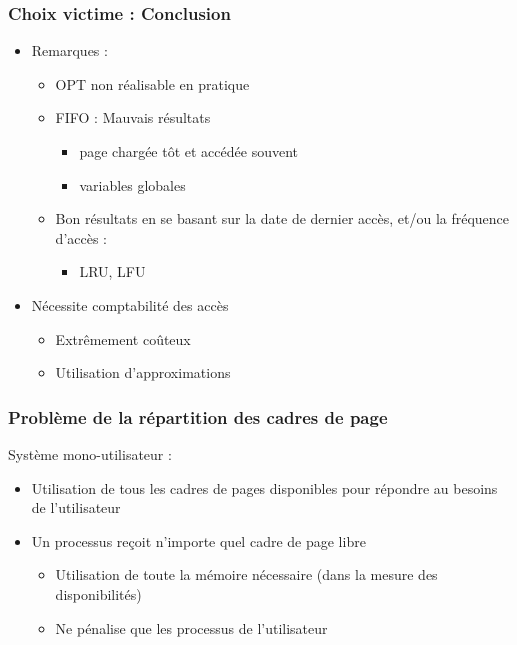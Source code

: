 \begin{frame}
\frametitle{Choix victime : Conclusion}
\begin{itemize}
\item Remarques :
\begin{itemize}
\item OPT non réalisable en pratique
\item FIFO : Mauvais résultats
\begin{itemize}
\item page chargée tôt et accédée souvent
\item variables globales
\end{itemize}

\item Bon résultats en se basant sur la date de dernier accès, et/ou la fréquence d'accès :
\begin{itemize}
\item LRU, LFU
\end{itemize}
\end{itemize}
\item Nécessite comptabilité des accès
\begin{itemize}
\item Extrêmement coûteux
\item Utilisation d'approximations
\end{itemize}
\end{itemize}
\end{frame}


\begin{frame}
\frametitle{Problème de la répartition des cadres de page}
Système mono-utilisateur :
\begin{itemize}
\item Utilisation de tous les cadres de pages disponibles pour répondre au besoins de l'utilisateur
\item Un processus reçoit n'importe quel cadre de page libre
\begin{itemize}
\item Utilisation de toute la mémoire nécessaire (dans la mesure des disponibilités)
\item Ne pénalise que les processus de l'utilisateur
\end{itemize}
\end{itemize}
\end{frame}



